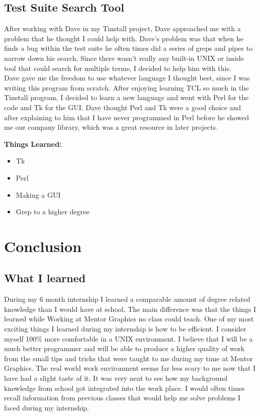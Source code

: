 \documentclass[letterpaper,10pt,notitlepage,fleqn]{article}
\begin{document}
\subsection{Test Suite Search Tool}
\indent After working with Dave in my Tinstall project, Dave approached me with a problem 
that he thought I could help with. Dave's problem was that when he finds a bug within 
the test suite he often times did a series of greps and pipes to narrow down his 
search. Since there wasn't really any built-in UNIX or inside tool that could search 
for multiple terms, I decided to help him with this. \\ 
\indent Dave gave me the freedom to use whatever language I thought best, since I was writing 
this program from scratch. After enjoying learning TCL so much in the Tinstall 
program, I decided to learn a new language and went with Perl for the code and Tk 
for the GUI. Dave thought Perl and Tk were a good choice and after explaining to 
him that I have never programmed in Perl before he showed me our company library, 
which was a great resource in later projects.

\textbf{Things Learned:}
\begin{itemize} 
        \item Tk
        \item Perl
        \item Making a GUI
        \item Grep to a higher degree
    \end{itemize}

\section{Conclusion}
\subsection{What I learned}
\indent During my 6 month internship I learned a comparable amount of degree related knowledge
than I would have at school. The main difference was that the things I learned while 
Working at Mentor Graphics no class could teach. One of my most exciting things 
I learned during my internship is how to be efficient. I consider myself 100\% more 
comfortable in a UNIX environment. I believe that I will be a much better programmer 
and will be able to produce a higher quality of work from the small tips and tricks 
that were taught to me during my time at Mentor Graphics. The real world work environment seems 
far less scary to me now that I have had a slight taste of it. It was very neat 
to see how my background knowledge from school got integrated into the work place.
I would often times recall information from previous classes that would help me 
solve problems I faced during my internship. 
\\
\end{document}
